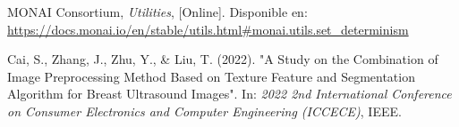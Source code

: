 \documentclass[12pt]{article}
\begin{document}
\begin{thebibliography}{9}
MONAI Consortium, \textit{Utilities}, [Online]. Disponible en: \url{https://docs.monai.io/en/stable/utils.html#monai.utils.set_determinism}

Cai, S., Zhang, J., Zhu, Y., \& Liu, T. (2022). "A Study on the Combination of Image Preprocessing Method Based on Texture Feature and Segmentation Algorithm for Breast Ultrasound Images". In: \textit{2022 2nd International Conference on Consumer Electronics and Computer Engineering (ICCECE)}, IEEE.



\end{thebibliography}
\end{document}
